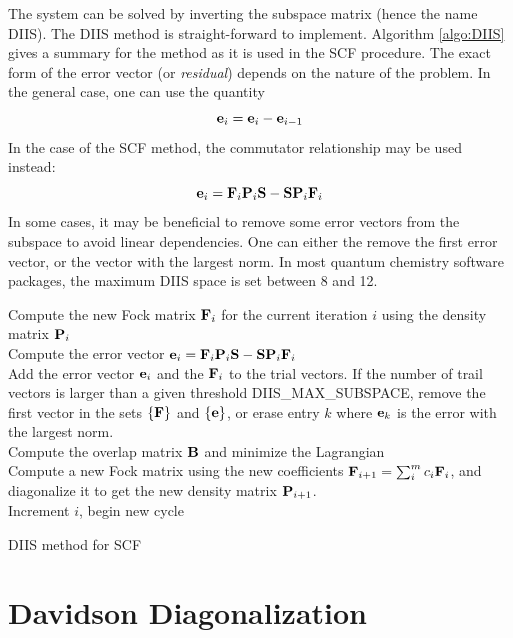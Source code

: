 \noindent The system can be solved by inverting the subspace matrix (hence the name DIIS). 
The DIIS method is straight-forward to implement. Algorithm \ref{algo:DIIS} gives a summary for the method as it is used in the SCF procedure. 
The exact form of the error vector (or \emph{residual}) depends on the nature of the problem. In the general case, one can use the quantity
\begin{equation}
\mathbf{e}_i = \mathbf{e}_i - \mathbf{e}_{i-1}
\end{equation}
\noindent In the case of the SCF method, the commutator relationship may be used instead:
\begin{equation}
\mathbf{e}_i = \mathbf{F}_i \mathbf{P}_i \mathbf{S} - \mathbf{S} \mathbf{P}_i \mathbf{F}_i 
\end{equation}
In some cases, it may be beneficial to remove some error vectors from the subspace to avoid linear dependencies. One can either the remove the first error vector, or the vector with the largest norm. In most quantum chemistry software packages, the maximum DIIS space is set between 8 and 12. 

\begin{algorithm}
Compute the new Fock matrix $\mathbf{F}_i$ for the current iteration $i$ using the density matrix $\mathbf{P}_i$
\\
Compute the error vector $\mathbf{e}_i = \mathbf{F}_i \mathbf{P}_i \mathbf{S} - \mathbf{S} \mathbf{P}_i \mathbf{F}_i$
\\
Add the error vector $\mathbf{e}_i$ and the $\mathbf{F}_i$ to the trial vectors. If the number of trail vectors is larger than a given threshold \textrm{DIIS\_MAX\_SUBSPACE}, remove  the first vector in the sets $\{\mathbf{F}\}$ and $\{\mathbf{e}\}$, or erase entry $k$ where $\mathbf{e}_k$ is the error with the largest norm.
\\
Compute the overlap matrix $\mathbf{B}$ and minimize the Lagrangian
\\
Compute a new Fock matrix using the new coefficients $\mathbf{F}_{i+1} = \sum_i^m c_i \mathbf{F}_i$, and diagonalize it to get the new density matrix $\mathbf{P}_{i+1}$. 
\\
Increment $i$, begin new cycle
\caption{DIIS method for SCF}
\label{algo:DIIS}
\end{algorithm} 

\section{Davidson Diagonalization \label{sec:DAV}}

